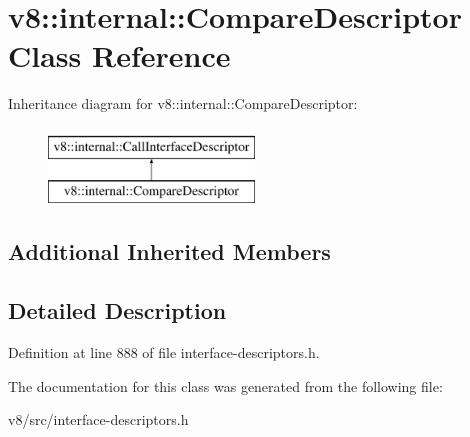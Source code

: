 \hypertarget{classv8_1_1internal_1_1CompareDescriptor}{}\section{v8\+:\+:internal\+:\+:Compare\+Descriptor Class Reference}
\label{classv8_1_1internal_1_1CompareDescriptor}
Inheritance diagram for v8\+:\+:internal\+:\+:Compare\+Descriptor\+:\begin{figure}[H]
\begin{center}
\leavevmode
\includegraphics[height=2.000000cm]{classv8_1_1internal_1_1CompareDescriptor}
\end{center}
\end{figure}
\subsection*{Additional Inherited Members}


\subsection{Detailed Description}


Definition at line 888 of file interface-\/descriptors.\+h.



The documentation for this class was generated from the following file\+:\begin{DoxyCompactItemize}
\item 
v8/src/interface-\/descriptors.\+h\end{DoxyCompactItemize}
